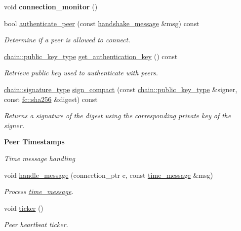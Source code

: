 \begin{DoxyCompactItemize}
void {\bfseries connection\+\_\+monitor} ()
\item 
bool \mbox{\hyperlink{classaacio_1_1net__plugin__impl_a4f282701a98cbb4ea2f945b1a1bf1d3c}{authenticate\+\_\+peer}} (const \mbox{\hyperlink{structaacio_1_1handshake__message}{handshake\+\_\+message}} \&msg) const
\begin{DoxyCompactList}\small\item\em Determine if a peer is allowed to connect. \end{DoxyCompactList}\item 
\mbox{\hyperlink{classfc_1_1crypto_1_1public__key}{chain\+::public\+\_\+key\+\_\+type}} \mbox{\hyperlink{classaacio_1_1net__plugin__impl_ae0c80b9cd48e8885b2366eae880dd285}{get\+\_\+authentication\+\_\+key}} () const
\begin{DoxyCompactList}\small\item\em Retrieve public key used to authenticate with peers. \end{DoxyCompactList}\item 
\mbox{\hyperlink{classfc_1_1crypto_1_1signature}{chain\+::signature\+\_\+type}} \mbox{\hyperlink{classaacio_1_1net__plugin__impl_a3bd802a5735b37c5961a01247b0db2a0}{sign\+\_\+compact}} (const \mbox{\hyperlink{classfc_1_1crypto_1_1public__key}{chain\+::public\+\_\+key\+\_\+type}} \&signer, const \mbox{\hyperlink{classfc_1_1sha256}{fc\+::sha256}} \&digest) const
\begin{DoxyCompactList}\small\item\em Returns a signature of the digest using the corresponding private key of the signer. \end{DoxyCompactList}\end{DoxyCompactItemize}
\begin{Indent}\textbf{ Peer Timestamps}\par
{\em Time message handling }\begin{DoxyCompactItemize}
\item 
void \mbox{\hyperlink{classaacio_1_1net__plugin__impl_acb86ea89d6a903fb512c5afc5f6719e0}{handle\+\_\+message}} (connection\+\_\+ptr c, const \mbox{\hyperlink{structaacio_1_1time__message}{time\+\_\+message}} \&msg)
\begin{DoxyCompactList}\small\item\em Process \mbox{\hyperlink{structaacio_1_1time__message}{time\+\_\+message}}. \end{DoxyCompactList}\item 
\mbox{\label{classaacio_1_1net__plugin__impl_a5a8f80077600440095a1b1d04de13f2e}} 
void \mbox{\hyperlink{classaacio_1_1net__plugin__impl_a5a8f80077600440095a1b1d04de13f2e}{ticker}} ()
\begin{DoxyCompactList}\small\item\em Peer heartbeat ticker. \end{DoxyCompactList}\end{DoxyCompactItemize}
\end{Indent}
